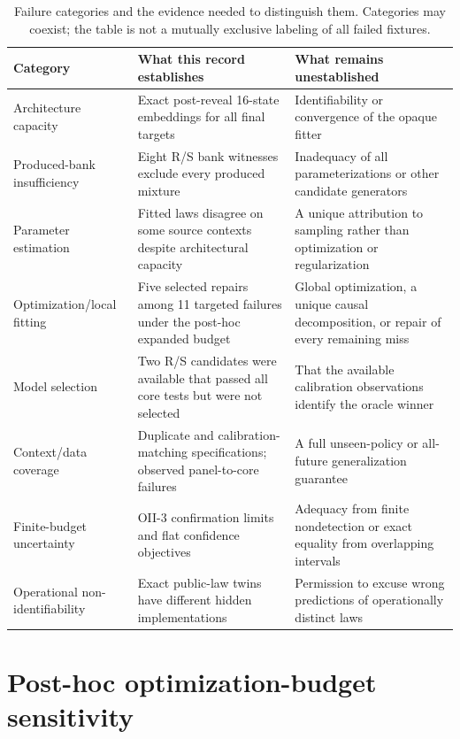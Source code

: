 \begin{table}[tbp]
\centering\caption{Failure categories and the evidence needed to distinguish them. Categories may coexist; the table is not a mutually exclusive labeling of all failed fixtures.}\label{tab:failure-taxonomy}
\footnotesize\begin{tabularx}{\linewidth}{@{}>{\raggedright\arraybackslash}p{.22\linewidth}YY@{}}\toprule
Category & What this record establishes & What remains unestablished\\\midrule
Architecture capacity & Exact post-reveal 16-state embeddings for all final targets & Identifiability or convergence of the opaque fitter\\
Produced-bank insufficiency & Eight R/S bank witnesses exclude every produced mixture & Inadequacy of all parameterizations or other candidate generators\\
Parameter estimation & Fitted laws disagree on some source contexts despite architectural capacity & A unique attribution to sampling rather than optimization or regularization\\
Optimization/local fitting & Five selected repairs among 11 targeted failures under the post-hoc expanded budget & Global optimization, a unique causal decomposition, or repair of every remaining miss\\
Model selection & Two R/S candidates were available that passed all core tests but were not selected & That the available calibration observations identify the oracle winner\\
Context/data coverage & Duplicate and calibration-matching specifications; observed panel-to-core failures & A full unseen-policy or all-future generalization guarantee\\
Finite-budget uncertainty & OII-3 confirmation limits and flat confidence objectives & Adequacy from finite nondetection or exact equality from overlapping intervals\\
Operational non-identifiability & Exact public-law twins have different hidden implementations & Permission to excuse wrong predictions of operationally distinct laws\\\bottomrule
\end{tabularx}
\end{table}



\section{Post-hoc optimization-budget sensitivity}\label{sec:sensitivity}\label{p3:s02}
